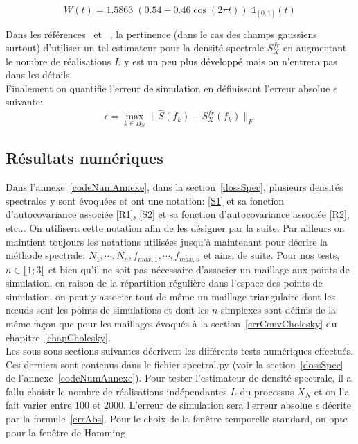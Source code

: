 \begin{equation} W(t) = 1.5863 \;(0.54 - 0.46\cos(2\pi t))\;\mathds{1}_{[0,1]}(t) \end{equation}

Dans les références~\cite{FogliCoursX} et~\cite{alma991000210539806616} , la pertinence (dans le cas des champs gaussiens surtout)
d'utiliser un tel estimateur pour la densité spectrale $S_X^{fr}$ en augmentant le nombre de réalisations $L$
y est un peu plus développé mais on n'entrera pas dans les détails.\\

Finalement on quantifie l'erreur de simulation en définissant l'erreur absolue $\epsilon$ suivante:
\begin{equation}  \epsilon = \max_{k \in B_N} \|\hat{S}(f_k) - S_X^{fr}(f_k)\|_{F}  \label{errAbs}\end{equation}

\subsection{Résultats numériques}

Dans l'annexe~\ref{codeNumAnnexe}, dans la section~\ref{dossSpec}, plusieurs
densités spectrales y sont évoquées et ont une notation: \eqref{S1} et sa fonction d'autocovariance associée \eqref{R1}, \eqref{S2}
et sa fonction d'autocovariance associée \eqref{R2}, etc... On utilisera cette notation afin de les désigner par la suite.
Par ailleurs  on maintient toujours les notations utilisées jusqu'à maintenant pour décrire la
méthode spectrale: $N_1, \cdots, N_n, f_{max,1}, \cdots, f_{max,n}$ et ainsi de suite. Pour nos tests, $n \in \llbracket 1;3 \rrbracket$ et
bien qu'il ne soit pas nécessaire d'associer un maillage aux points de simulation, en raison de la répartition régulière dans l'espace
des points de simulation, on peut y associer tout de même un maillage
triangulaire dont les n\oe uds sont les points de simulations et dont les $n$-simplexes sont définis de la même façon que pour les maillages
évoqués à la section~\ref{errConvCholesky} du chapitre~\ref{chapCholesky}.\\


Les sous-sous-sections suivantes décrivent les différents tests numériques effectués. Ces derniers sont contenus dans le fichier spectral.py (voir la section~\ref{dossSpec} de
l'annexe~\ref{codeNumAnnexe}). Pour tester l'estimateur de densité spectrale, il a fallu choisir le nombre de réalisations indépendantes $L$
du processus $X_N$ et on l'a fait varier entre $100$ et $2000$. L'erreur de simulation sera l'erreur absolue $\epsilon$
décrite par la formule~\eqref{errAbs}. Pour le choix de la fenêtre temporelle
standard, on opte pour la fenêtre de Hamming.

